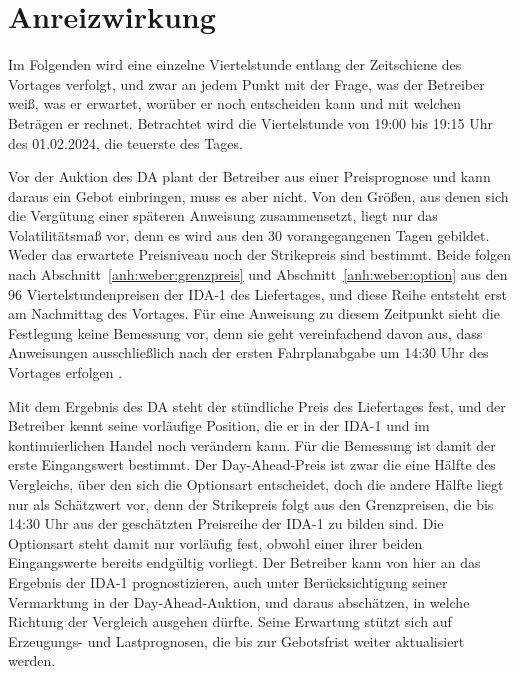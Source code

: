 \section{Anreizwirkung}
\label{anh:weber:anreiz}

Im Folgenden wird eine einzelne Viertelstunde entlang der Zeitschiene des Vortages verfolgt, und zwar an jedem Punkt mit der Frage, was der Betreiber weiß, was er erwartet, worüber er noch entscheiden kann und mit welchen Beträgen er rechnet. Betrachtet wird die Viertelstunde von 19:00 bis 19:15 Uhr des 01.02.2024, die teuerste des Tages.

Vor der Auktion des \ac{DA} plant der Betreiber aus einer Preisprognose und kann daraus ein Gebot einbringen, muss es aber nicht. Von den Größen, aus denen sich die Vergütung einer späteren Anweisung zusammensetzt, liegt nur das Volatilitätsmaß vor, denn es wird aus den 30 vorangegangenen Tagen gebildet. Weder das erwartete Preisniveau noch der Strikepreis sind bestimmt. Beide folgen nach Abschnitt~\ref{anh:weber:grenzpreis} und Abschnitt~\ref{anh:weber:option} aus den 96 Viertelstundenpreisen der \ac{IDA-1} des Liefertages, und diese Reihe entsteht erst am Nachmittag des Vortages. Für eine Anweisung zu diesem Zeitpunkt sieht die Festlegung keine Bemessung vor, denn sie geht vereinfachend davon aus, dass Anweisungen ausschließlich nach der ersten Fahrplanabgabe um 14:30 Uhr des Vortages erfolgen \cite{bundesnetzagentur_anlage1_2024}.

Mit dem Ergebnis des \ac{DA} steht der stündliche Preis des Liefertages fest, und der Betreiber kennt seine vorläufige Position, die er in der \ac{IDA-1} und im kontinuierlichen Handel noch verändern kann. Für die Bemessung ist damit der erste Eingangswert bestimmt. Der Day-Ahead-Preis ist zwar die eine Hälfte des Vergleichs, über den sich die Optionsart entscheidet, doch die andere Hälfte liegt nur als Schätzwert vor, denn der Strikepreis folgt aus den Grenzpreisen, die bis 14:30 Uhr aus der geschätzten Preisreihe der \ac{IDA-1} zu bilden sind. Die Optionsart steht damit nur vorläufig fest, obwohl einer ihrer beiden Eingangswerte bereits endgültig vorliegt. Der Betreiber kann von hier an das Ergebnis der \ac{IDA-1} prognostizieren, auch unter Berücksichtigung seiner Vermarktung in der Day-Ahead-Auktion, und daraus abschätzen, in welche Richtung der Vergleich ausgehen dürfte. Seine Erwartung stützt sich auf Erzeugungs- und Lastprognosen, die bis zur Gebotsfrist weiter aktualisiert werden.

